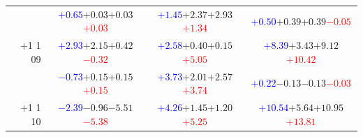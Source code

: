 \documentclass[compress]{beamer}
\begin{document}
\begin{frame}
\begin{tabular}{r | c | c | c}
          & \textcolor{blue}{$+0.65$}\hspace{0.1 cm}$+0.03$\hspace{0.1 cm}$+0.03$\hspace{0.1 cm}\textcolor{red}{$+0.03$} & \textcolor{blue}{$+1.45$}\hspace{0.1 cm}$+2.37$\hspace{0.1 cm}$+2.93$\hspace{0.1 cm}\textcolor{red}{$+1.34$} & \textcolor{blue}{$+0.50$}\hspace{0.1 cm}$+0.39$\hspace{0.1 cm}$+0.39$\hspace{0.1 cm}\textcolor{red}{$-0.05$} \\
$+$1 1 09 & \textcolor{blue}{$+2.93$}\hspace{0.1 cm}$+2.15$\hspace{0.1 cm}$+0.42$\hspace{0.1 cm}\textcolor{red}{$-0.32$} & \textcolor{blue}{$+2.58$}\hspace{0.1 cm}$+0.40$\hspace{0.1 cm}$+0.15$\hspace{0.1 cm}\textcolor{red}{$+5.05$} & \textcolor{blue}{$+8.39$}\hspace{0.1 cm}$+3.43$\hspace{0.1 cm}$+9.12$\hspace{0.1 cm}\textcolor{red}{$+10.42$} \\
          & \textcolor{blue}{$-0.73$}\hspace{0.1 cm}$+0.15$\hspace{0.1 cm}$+0.15$\hspace{0.1 cm}\textcolor{red}{$+0.15$} & \textcolor{blue}{$+3.73$}\hspace{0.1 cm}$+2.01$\hspace{0.1 cm}$+2.57$\hspace{0.1 cm}\textcolor{red}{$+3.74$} & \textcolor{blue}{$+0.22$}\hspace{0.1 cm}$-0.13$\hspace{0.1 cm}$-0.13$\hspace{0.1 cm}\textcolor{red}{$-0.03$} \\
$+$1 1 10 & \textcolor{blue}{$-2.39$}\hspace{0.1 cm}$-0.96$\hspace{0.1 cm}$-5.51$\hspace{0.1 cm}\textcolor{red}{$-5.38$} & \textcolor{blue}{$+4.26$}\hspace{0.1 cm}$+1.45$\hspace{0.1 cm}$+1.20$\hspace{0.1 cm}\textcolor{red}{$+5.25$} & \textcolor{blue}{$+10.54$}\hspace{0.1 cm}$+5.64$\hspace{0.1 cm}$+10.95$\hspace{0.1 cm}\textcolor{red}{$+13.81$} \\

\end{tabular}
\end{frame}
\end{document}

